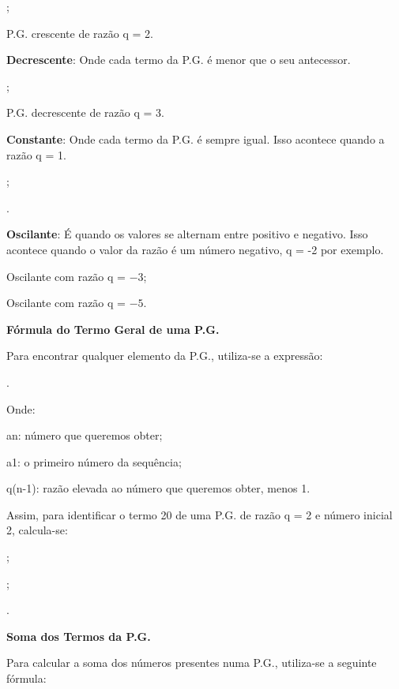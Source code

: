 \begin{multicols*}{2}
;

 P.G. crescente de razão q = 2.

\textbf{Decrescente}: Onde cada termo da P.G. é menor que o seu antecessor.

;

 P.G. decrescente de razão q = 3.

\textbf{Constante}: Onde cada termo da P.G. é sempre igual. Isso acontece quando a razão q = 1.

;

.

\textbf{Oscilante}: É quando os valores se alternam entre positivo e negativo. Isso acontece quando o valor da razão é um número negativo, q = -2 por exemplo.

 Oscilante com razão q = $-3$;

 Oscilante com razão q = $-5$.

\textbf{Fórmula do Termo Geral de uma P.G.}

Para encontrar qualquer elemento da P.G., utiliza-se a expressão:

.

Onde:

an: número que queremos obter;

a1: o primeiro número da sequência;

q(n-1): razão elevada ao número que queremos obter, menos 1.

Assim, para identificar o termo 20 de uma P.G. de razão q = 2 e número inicial 2, calcula-se:


;

;

.

\textbf{Soma dos Termos da P.G.}

Para calcular a soma dos números presentes numa P.G., utiliza-se a seguinte fórmula:


\end{multicols*}
